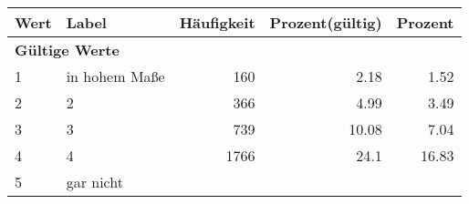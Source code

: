      \begin{longtable}{lXrrr}
     \toprule
     \textbf{Wert} & \textbf{Label} & \textbf{Häufigkeit} & \textbf{Prozent(gültig)} & \textbf{Prozent} \\
     \endhead
     \midrule
     \multicolumn{5}{l}{\textbf{Gültige Werte}}\\

     1 &
     \multicolumn{1}{X}{ in hohem Maße   } &


       \num{160} &
       \num[round-mode=places,round-precision=2]{2,18} &
         \num[round-mode=places,round-precision=2]{1,52} \\

     2 &
     \multicolumn{1}{X}{ 2   } &


       \num{366} &
       \num[round-mode=places,round-precision=2]{4,99} &
         \num[round-mode=places,round-precision=2]{3,49} \\

     3 &
     \multicolumn{1}{X}{ 3   } &


       \num{739} &
       \num[round-mode=places,round-precision=2]{10,08} &
         \num[round-mode=places,round-precision=2]{7,04} \\

     4 &
     \multicolumn{1}{X}{ 4   } &


       \num{1766} &
       \num[round-mode=places,round-precision=2]{24,1} &
         \num[round-mode=places,round-precision=2]{16,83} \\

     5 &
     \multicolumn{1}{X}{ gar nicht   } &



\end{longtable}
